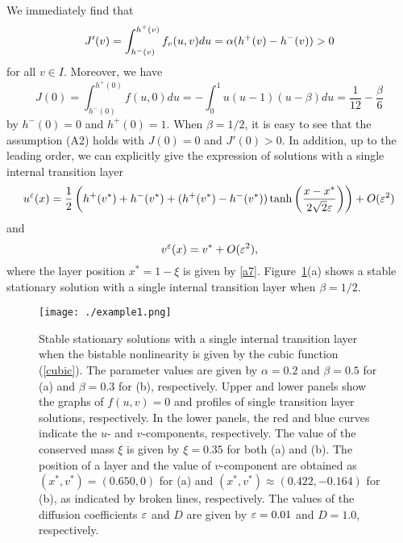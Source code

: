 \documentclass[a4,10pt]{article}
\begin{document}
We immediately find that 
$$%
\begin{array}{l}
J'(v) =  \dis\int_{h^-(v)}^{h^+(v)} f_v(u, v)du =  \alpha (h^+(v) - h^-(v)) > 0
\end{array} 
$$%
%
for all $v \in I$. Moreover, we have
%
$$%
J(0) = \int_{h^-(0)}^{h^+(0)} f(u, 0)du  = - \int_0^1 u(u-1)(u-\beta) du = \frac{1}{12} - \frac{\beta}{6} 
$$%
%
by $h^-(0) = 0$ and $h^+(0) = 1$. 
When $\beta = 1/2$, it is easy to see that the assumption (A2) 
holds with $J(0)= 0$ and $J'(0) > 0 $.
%
In addition, up to the leading order, we can explicitly give the expression of solutions with
a single internal transition layer
$$
u^\varepsilon(x) = \displaystyle \frac{1}{2} \left( h^+(v^*) + h^-(v^*) + (h^+(v^*) - h^-(v^*)) \tanh \left( \frac{x - x^*}{2 \sqrt{2} \varepsilon} \right) \right) + O(\varepsilon^2)
$$
and 
$$ 
v^\varepsilon(x) = \displaystyle v^* + O(\varepsilon^2), 
$$
%
where the layer position $x^* = 1 - \xi$ is given by \eqref{a7}.
Figure~\ref{example1}(a) shows 
a stable stationary solution with a single internal transition layer when $\beta = 1/2$. 
%
\begin{figure}[ht!]
\centering
\texttt{[image: ./example1.png]}
  \caption{Stable stationary solutions with a single internal transition layer when
the bistable nonlinearity is given by the cubic function (\ref{cubic}). 
  The parameter values are given by $\alpha = 0.2$ and $\beta = 0.5$ for (a) and 
  $\beta = 0.3$ for (b), respectively. Upper and lower panels show the graphs of $f(u,v) =0$ and profiles of single transition layer solutions, respectively. In the lower panels, the red and blue curves indicate the $u$- and $v$-components, respectively.
 The value of the conserved mass $\xi$ is given by $\xi = 0.35$ for both (a) and (b). 
 The position of a layer and the value of $v$-component are obtained 
as $(x^*, v^*) = (0.650, 0)$ for (a) and $(x^*, v^*) \approx (0.422, -0.164)$ for (b), as indicated by broken lines, respectively. The values of the diffusion coefficients $\varepsilon$ and $D$ are given by $\varepsilon = 0.01$ and $D=1.0$, respectively. 
  }
  \label{example1}
\end{figure}
%
\end{document}
